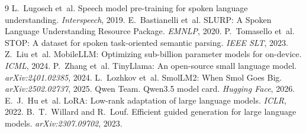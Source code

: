 \documentclass[12pt]{article}
\begin{document}
\begin{thebibliography}{9}
\scriptsize
\setlength{\itemsep}{-1.5pt}
\setlength{\parskip}{0pt}
L.~Lugosch et~al. Speech model pre-training for spoken language understanding. \textit{Interspeech}, 2019.
E.~Bastianelli et~al. SLURP: A Spoken Language Understanding Resource Package. \textit{EMNLP}, 2020.
P.~Tomasello et~al. STOP: A dataset for spoken task-oriented semantic parsing. \textit{IEEE SLT}, 2023.
Z.~Liu et~al. MobileLLM: Optimizing sub-billion parameter models for on-device. \textit{ICML}, 2024.
P.~Zhang et~al. TinyLlama: An open-source small language model. \textit{arXiv:2401.02385}, 2024.
L.~Lozhkov et~al. SmolLM2: When Smol Goes Big. \textit{arXiv:2502.02737}, 2025.
Qwen Team. Qwen3.5 model card. \textit{Hugging Face}, 2026.
E.~J.~Hu et~al. LoRA: Low-rank adaptation of large language models. \textit{ICLR}, 2022.
B.~T.~Willard and R.~Louf. Efficient guided generation for large language models. \textit{arXiv:2307.09702}, 2023.
\end{thebibliography}
\end{document}
